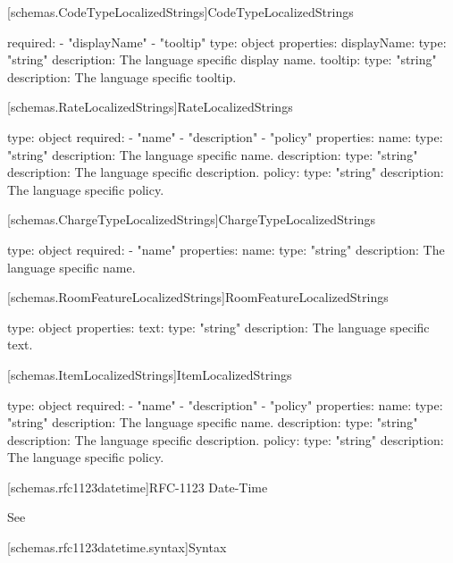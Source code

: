 [schemas.CodeTypeLocalizedStrings]{CodeTypeLocalizedStrings}
\begin{codeblock}
  required:
    - "displayName"
    - "tooltip"
  type: object
  properties:
    displayName:
      type: "string"
      description: The language specific display name. 
    tooltip:
      type: "string"
      description: The language specific tooltip. 
\end{codeblock}

[schemas.RateLocalizedStrings]{RateLocalizedStrings}
\begin{codeblock}
  type: object
  required:
    - "name"
    - "description"
    - "policy"
  properties:
    name:
      type: "string"
      description: The language specific name. 
    description:
      type: "string"
      description: The language specific description.
    policy:
      type: "string"
      description: The language specific policy.
\end{codeblock}

[schemas.ChargeTypeLocalizedStrings]{ChargeTypeLocalizedStrings}
\begin{codeblock}
  type: object
  required:
    - "name"
  properties:
     name:
        type: "string"
        description: The language specific name. 
\end{codeblock}

[schemas.RoomFeatureLocalizedStrings]{RoomFeatureLocalizedStrings}
\begin{codeblock}
  type: object
  properties:
   text:
      type: "string"
      description: The language specific text. 
\end{codeblock}

[schemas.ItemLocalizedStrings]{ItemLocalizedStrings}
\begin{codeblock}
  type: object
  required:
    - "name"
    - "description"
    - "policy"
  properties:
    name:
      type: "string"
      description: The language specific name. 
    description:
      type: "string"
      description: The language specific description.
    policy:
      type: "string"
      description: The language specific policy.
\end{codeblock}


[schemas.rfc1123datetime]{RFC-1123 Date-Time}

See 

[schemas.rfc1123datetime.syntax]{Syntax}


